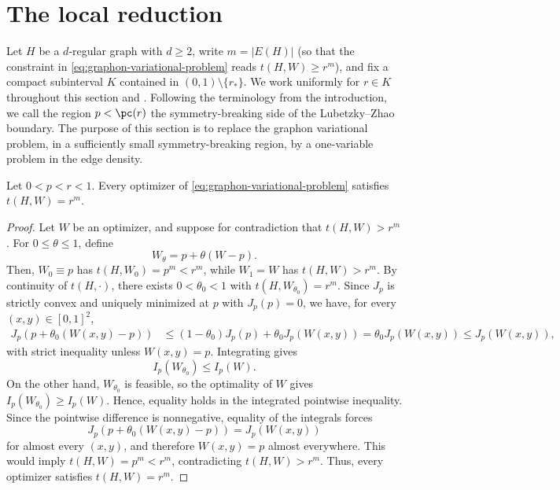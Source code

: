 \section{The local reduction}\label{sec:local-reduction}

Let $H$ be a $d$-regular graph with $d\ge2$, write $m=|E(H)|$ (so that the
constraint in \eqref{eq:graphon-variational-problem} reads $t(H,W)\ge r^m$), and fix a compact subinterval
$K$ contained in $(0,1) \setminus \{r_*\}$.  We work uniformly for
$r\in K$ throughout this section and .  Following the
terminology from the introduction, we call the region
$p<\pc(r)$ the symmetry-breaking side of the Lubetzky--Zhao boundary.  The
purpose of this section is to replace the graphon variational problem, in a
sufficiently small symmetry-breaking region, by a one-variable problem in the
edge density.

\begin{lemma}\label{lem:active-constraint}
Let $0<p<r<1$.  Every optimizer of \eqref{eq:graphon-variational-problem} satisfies
$t(H,W)=r^m$.
\end{lemma}

\begin{proof}
Let $W$ be an optimizer, and suppose for contradiction that $t(H,W)>r^m$.
For $0\le\theta\le1$, define
\[
  W_\theta=p+\theta(W-p).
\]
Then, $W_0\equiv p$ has $t(H,W_0)=p^m<r^m$, while $W_1=W$ has
$t(H,W)>r^m$.  By continuity of $t(H,\cdot)$, there exists
$0<\theta_0<1$ with $t(H,W_{\theta_0})=r^m$.  Since $J_p$ is strictly convex
and uniquely minimized at $p$ with $J_p(p) = 0$, we have, for every
$(x,y)\in[0,1]^2$,
\begin{align*}
  J_p(p+\theta_0(W(x,y)-p))
  & {}
  \le
  (1-\theta_0)J_p(p)+\theta_0J_p(W(x,y))
  =
  \theta_0J_p(W(x,y))
  {}
  \le
  J_p(W(x,y)),
\end{align*}
with strict inequality unless $W(x,y)=p$.  Integrating gives
\[
   I_p(W_{\theta_0}) \le I_p(W).
\]
On the other hand, $W_{\theta_0}$ is feasible, so the optimality of $W$ gives
$I_p(W_{\theta_0})\ge I_p(W)$.  Hence, equality holds in the integrated
pointwise inequality.  Since the pointwise difference is nonnegative, equality
of the integrals forces
\[
  J_p(p+\theta_0(W(x,y)-p))=J_p(W(x,y))
\]
for almost every $(x,y)$, and therefore $W(x,y)=p$ almost everywhere.  This
would imply $t(H,W)=p^m<r^m$, contradicting $t(H,W)>r^m$.  Thus,  every
optimizer satisfies $t(H,W)=r^m$.
\end{proof}

